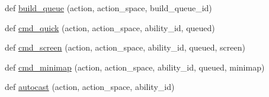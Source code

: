 \begin{DoxyCompactItemize}
\item 
def \mbox{\hyperlink{namespacepysc2_1_1lib_1_1actions_a6fbc9a64791ad0e6dddc5ad9a51e5e5b}{build\+\_\+queue}} (action, action\+\_\+space, build\+\_\+queue\+\_\+id)
\item 
def \mbox{\hyperlink{namespacepysc2_1_1lib_1_1actions_a2129f1b3173891d9a1d311d1dda40d78}{cmd\+\_\+quick}} (action, action\+\_\+space, ability\+\_\+id, queued)
\item 
def \mbox{\hyperlink{namespacepysc2_1_1lib_1_1actions_a6a71ca9bf1a3ce76be66fe022c827d4a}{cmd\+\_\+screen}} (action, action\+\_\+space, ability\+\_\+id, queued, screen)
\item 
def \mbox{\hyperlink{namespacepysc2_1_1lib_1_1actions_a60765a989aa093570dfcb690d81dd2d6}{cmd\+\_\+minimap}} (action, action\+\_\+space, ability\+\_\+id, queued, minimap)
\item 
def \mbox{\hyperlink{namespacepysc2_1_1lib_1_1actions_a30a09b1c2a0e2eb0799bb453dcc00842}{autocast}} (action, action\+\_\+space, ability\+\_\+id)
\end{DoxyCompactItemize}

